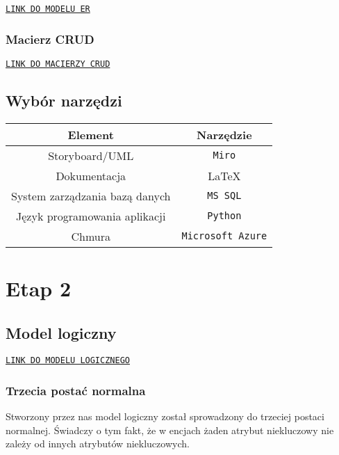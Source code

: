 \documentclass[10pt]{article}
\begin{document}
\noindent\texttt{\href{https://miro.com/app/board/o9J_lL9uIOo=/}{LINK DO MODELU ER}}

\subsubsection{Macierz CRUD}

\noindent\texttt{\href{https://wutwaw-my.sharepoint.com/:x:/g/personal/01143627_pw_edu_pl/EWBP5IBfqCFLiPvmQnpEDcAB0eGgw4UuIhm6bPNvxlSkyA?e=69XRhd}{LINK DO MACIERZY CRUD}}

\subsection{Wybór narzędzi}
\begin{table}[!h]
    \begin{center}
        \begin{tabular}{c|c}
            \textbf{Element} & \textbf{Narzędzie} \\
            \hline
            Storyboard/UML & \texttt{Miro} \\
            Dokumentacja & \LaTeX{} \\
            System zarządzania bazą danych & \texttt{MS SQL} \\
            Język programowania aplikacji & \texttt{Python} \\
            Chmura & \texttt{Microsoft Azure}
        \end{tabular}
    \end{center}
\end{table}

\pagebreak %

\section{Etap 2}

\subsection{Model logiczny}
\noindent \texttt{\href{https://github.com/JMazurkiewicz/BD2-Catering/blob/modeling/docs/logical-model.pdf}{LINK DO MODELU LOGICZNEGO}}

\subsubsection{Trzecia postać normalna}
Stworzony przez nas model logiczny został sprowadzony do trzeciej postaci normalnej. Świadczy o tym fakt, że w encjach żaden atrybut niekluczowy nie zależy od innych atrybutów niekluczowych.
\end{document}
